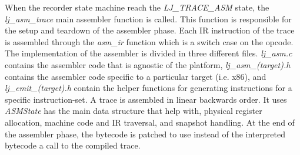 
When the recorder state machine reach the \emph{LJ\_TRACE\_ASM} state, the
\emph{lj\_asm\_trace} main assembler function is called. This function is
responsible for the setup and teardown of the assembler phase. Each IR
instruction of the trace is assembled through the \emph{asm\_ir} function which
is a switch case on the opcode. The implementation of the assembler is divided
in three different files. \emph{lj\_asm.c} contains the assembler code that is
agnostic of the platform, \emph{lj\_asm\_(target).h} contains the assembler code
specific to a particular target (i.e. x86), and \emph{lj\_emit\_(target).h}
contain the helper functions for generating instructions for a specific
instruction-set. A trace is assembled in linear backwards order. It uses
\emph{ASMState} has the main data structure that help with, physical register
allocation, machine code and IR traversal, and snapshot handling. At the end of
the assembler phase, the bytecode is patched to use instead of the interpreted
bytecode a call to the compiled trace.

